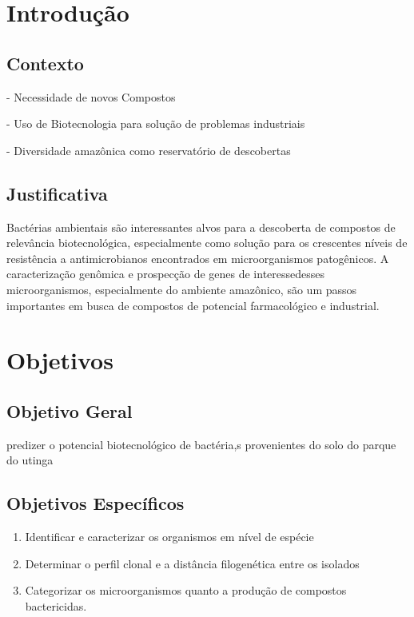 \chapter{Introdução}
\label{cap:introducao}

\section{Contexto}
- Necessidade de novos Compostos

- Uso de Biotecnologia para solução de problemas industriais

- Diversidade amazônica como reservatório de descobertas

\section{Justificativa}
Bactérias ambientais são interessantes alvos para a descoberta de compostos
de relevância biotecnológica, especialmente como solução para os crescentes níveis
de resistência a antimicrobianos encontrados em microorganismos patogênicos.
A caracterização genômica e prospecção de genes de interessedesses microorganismos,
especialmente do ambiente amazônico, são um passos importantes
em busca de compostos de potencial farmacológico e industrial.

\chapter{Objetivos}

\section{Objetivo Geral}

predizer o potencial biotecnológico de bactéria,s
provenientes do solo do parque do utinga 

\section{Objetivos Específicos}
\begin{enumerate}
    \item Identificar e caracterizar os organismos em nível de espécie
    \item Determinar o perfil clonal e a distância filogenética entre os isolados
    \item Categorizar os microorganismos quanto a produção de compostos bactericidas.
\end{enumerate}





